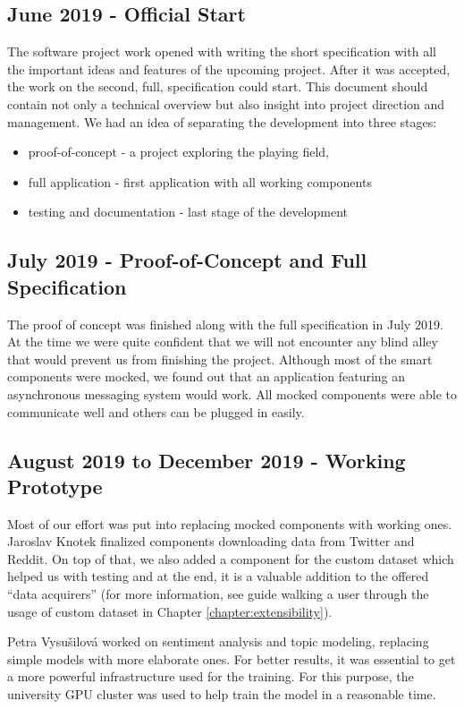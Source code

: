 \subsection{June 2019 - Official Start}
The software project work opened with writing the short specification with all the important ideas and features of the upcoming project. After it was accepted, the work on the second, full, specification could start. This document should contain not only a technical overview but also insight into project direction and management. We had an idea of separating the development into three stages: 
\begin{itemize}
    \item proof-of-concept - a project exploring the playing field, 
    \item full application - first application with all working components
    \item testing and documentation - last stage of the development
\end{itemize}

\subsection{July 2019 - Proof-of-Concept and Full Specification}

The proof of concept was finished along with the full specification in July 2019. At the time we were quite confident that we will not encounter any blind alley that would prevent us from finishing the project. Although most of the smart components were mocked, we found out that an application featuring an asynchronous messaging system would work. All mocked components were able to communicate well and others can be plugged in easily. 

\subsection{August 2019 to December 2019 - Working Prototype}

Most of our effort was put into replacing mocked components with working ones. Jaroslav Knotek finalized components downloading data from Twitter and Reddit. On top of that, we also added a component for the custom dataset which helped us with testing and at the end, it is a valuable addition to the offered ``data acquirers'' (for more information, see guide walking a user through the usage of custom dataset in Chapter \ref{chapter:extensibility}). 

Petra Vysušilová worked on sentiment analysis and topic modeling, replacing simple models with more elaborate ones. For better results, it was essential to get a more powerful infrastructure used for the training. For this purpose, the university GPU cluster was used to help train the model in a reasonable time. 

